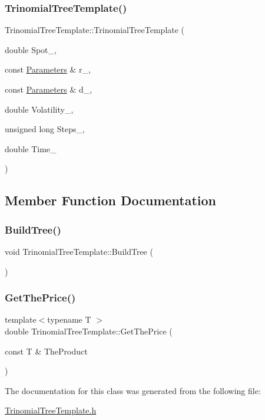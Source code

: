 \subsubsection{\texorpdfstring{Trinomial\+Tree\+Template()}{TrinomialTreeTemplate()}}
{\footnotesize\ttfamily Trinomial\+Tree\+Template\+::\+Trinomial\+Tree\+Template (\begin{DoxyParamCaption}\item[{double}]{Spot\+\_\+,  }\item[{const \hyperlink{classParameters}{Parameters} \&}]{r\+\_\+,  }\item[{const \hyperlink{classParameters}{Parameters} \&}]{d\+\_\+,  }\item[{double}]{Volatility\+\_\+,  }\item[{unsigned long}]{Steps\+\_\+,  }\item[{double}]{Time\+\_\+ }\end{DoxyParamCaption})\hspace{0.3cm}{\ttfamily [inline]}}



\subsection{Member Function Documentation}
\hypertarget{classTrinomialTreeTemplate_aa923006b38e206390573624227692aae}{}\label{classTrinomialTreeTemplate_aa923006b38e206390573624227692aae} 
\subsubsection{\texorpdfstring{Build\+Tree()}{BuildTree()}}
{\footnotesize\ttfamily void Trinomial\+Tree\+Template\+::\+Build\+Tree (\begin{DoxyParamCaption}{ }\end{DoxyParamCaption})\hspace{0.3cm}{\ttfamily [inline]}}

\hypertarget{classTrinomialTreeTemplate_a3b94ed75af412cac1e2249ef97daa8e6}{}\label{classTrinomialTreeTemplate_a3b94ed75af412cac1e2249ef97daa8e6} 
\subsubsection{\texorpdfstring{Get\+The\+Price()}{GetThePrice()}}
{\footnotesize\ttfamily template$<$typename T $>$ \\
double Trinomial\+Tree\+Template\+::\+Get\+The\+Price (\begin{DoxyParamCaption}\item[{const T \&}]{The\+Product }\end{DoxyParamCaption})\hspace{0.3cm}{\ttfamily [inline]}}



The documentation for this class was generated from the following file\+:\begin{DoxyCompactItemize}
\item 
\hyperlink{TrinomialTreeTemplate_8h}{Trinomial\+Tree\+Template.\+h}\end{DoxyCompactItemize}
